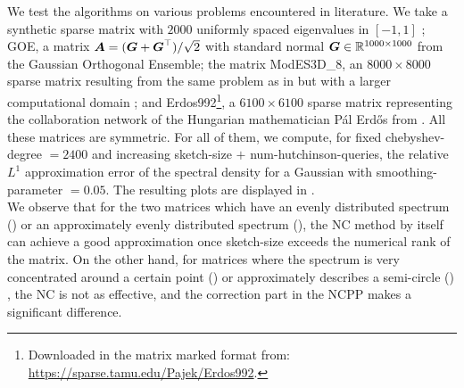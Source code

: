 We test the algorithms on various problems encountered in literature.
We take a synthetic sparse matrix with $2000$ uniformly spaced eigenvalues
in $[-1, 1]$ \cite{chen2021slq};
GOE, a matrix $\boldsymbol{A} = (\boldsymbol{G} + \boldsymbol{G}^{\top})/\sqrt{2}$ with standard
normal $\boldsymbol{G} \in \mathbb{R}^{1000 \times 1000}$ from the Gaussian Orthogonal Ensemble;
the matrix ModES3D\_8, an $8000 \times 8000$ sparse matrix resulting
from the same problem as in  but with
a larger computational domain \cite{lin2017randomized}; and
Erdos992\footnote{Downloaded in the matrix marked format from: \url{https://sparse.tamu.edu/Pajek/Erdos992}.},
a $6100 \times 6100$ sparse matrix representing the collaboration network of the
Hungarian mathematician P\'al Erd\H{o}s from \cite{chen2021slq}.
All these
matrices are symmetric. For all of them, we compute, for
fixed \gls{chebyshev-degree} $=2400$ and increasing \gls{sketch-size} $+$ \gls{num-hutchinson-queries},
the relative $L^1$ approximation error
of the spectral density for a Gaussian  with
\gls{smoothing-parameter} $=0.05$. The resulting plots are displayed in 
.\\ 

We observe that for the two matrices which have an evenly distributed spectrum
() or an approximately
evenly distributed spectrum (),
the \gls{NC} method by itself can achieve a good approximation once \gls{sketch-size}
exceeds the numerical rank of the matrix. On the other hand, for matrices where
the spectrum is very concentrated around a certain point ()
or approximately describes a semi-circle () \cite{wigner1958distribution},
the \gls{NC} is not as effective, and the correction part in the \gls{NCPP} makes
a significant difference.

